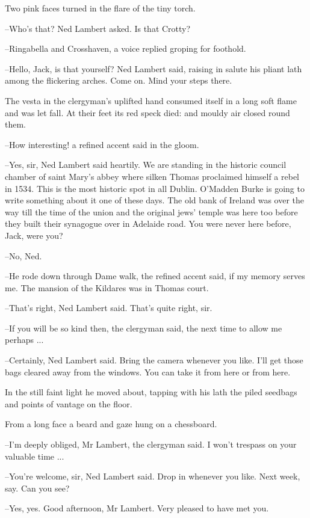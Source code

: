 Two pink faces turned in the flare of the tiny torch.

--Who's that? Ned Lambert asked.
Is that Crotty?

--Ringabella and Crosshaven,
a voice replied groping for foothold.

--Hello, Jack, is that yourself?
Ned Lambert said,
raising in salute his pliant lath
among the flickering arches.
Come on.
Mind your steps there.

The vesta in the clergyman's uplifted hand consumed itself
in a long soft
flame and was let fall.
At their feet its red speck died:
and mouldy air
closed round them.

--How interesting!
a refined accent said in the gloom.

--Yes, sir,
Ned Lambert said heartily.
We are standing in the historic
council chamber of saint Mary's abbey
where silken Thomas proclaimed
himself a rebel in 1534.
This is the most historic spot in all Dublin.
O'Madden Burke is going to write something about it
one of these days.
The old bank of Ireland was over the way
till the time of the union
and the
original jews' temple was here too
before they built their synagogue over
in Adelaide road.
You were never here before, Jack, were you?

--No, Ned.

--He rode down through Dame walk,
the refined accent said,
if my
memory serves me.
The mansion of the Kildares was in Thomas court.

--That's right,
Ned Lambert said.
That's quite right, sir.

--If you will be so kind then,
the clergyman said,
the next time to allow
me perhaps ...

--Certainly, Ned Lambert said.
Bring the camera whenever you like.
I'll get those bags cleared away from the windows.
You can take it from here or from here.

In the still faint light
he moved about,
tapping with his lath
the piled
seedbags and points of vantage on the floor.

From a long face
a beard and gaze hung on a chessboard.

--I'm deeply obliged, Mr Lambert,
the clergyman said.
I won't trespass on
your valuable time ...

--You're welcome, sir,
Ned Lambert said.
Drop in whenever you like.
Next
week, say.
Can you see?

--Yes, yes.
Good afternoon, Mr Lambert.
Very pleased to have met you.

